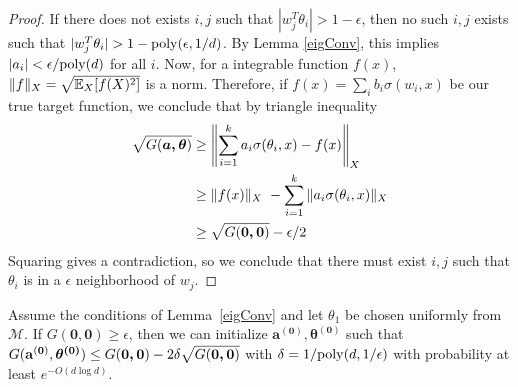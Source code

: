  \begin{proof}
 If there does not exists $i, j$ such that
   $|w_j^T\theta_i| > 1-\epsilon$, then no such $i, j$ exists such that $|w_j^T\theta_i|>1-\poly(\epsilon,1/d)$. By Lemma \ref{eigConv}, this implies $|a_i| < \epsilon/\mathrm{poly}(d)$ for all $i$. Now, for a integrable
   function $f(x)$, $\| f\|_X = \sqrt{\operatorname*{\mathbb{E}}_X[f(X)^2]}$ is a
   norm. Therefore, if $f(x) = \sum_i b_i \sigma(w_i,x)$ be our true
   target function, we conclude that by triangle inequality
\begin{align*}
\sqrt{G(\boldsymbol{a,\theta})}  & \geq \left\lVert \sum_{i=1}^k a_i \sigma(\theta_i,x) - f(x) \right\rVert_X \\
&\geq \|f(x)\|_X\ - \sum_{i=1}^k \|a_i\sigma(\theta_i,x) \|_X \\
& \geq
  \sqrt{G(\boldsymbol{0,0})} - \epsilon/2
\end{align*}
Squaring gives a contradiction, so we conclude that there must exist $i, j$ such that $\theta_i$ is in a $\epsilon$ neighborhood of $w_j$.
 \end{proof}
 
 \begin{lemma}\label{initialize}
Assume the conditions of Lemma~\ref{eigConv} and let $\theta_1$ be chosen uniformly from $\mathcal{M}$. If $G(\boldsymbol{0,0}) \geq \epsilon$, then we can initialize $\boldsymbol{a^{(0)},\theta^{(0)}}$ such that $G({\bf a^{(0)}, \boldsymbol{\theta^{(0)}}}) \leq G(\boldsymbol{0,0}) - 2\delta\sqrt{G(\boldsymbol{0,0})}$ with $\delta = 1/\mathrm{poly}(d,1/\epsilon)$ with probability at least $e^{-O(d \log d)}$.
 \end{lemma}
 
